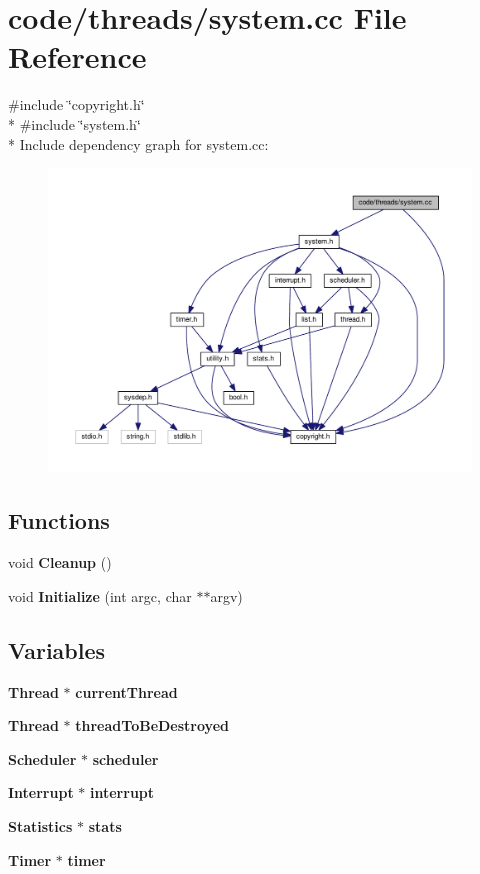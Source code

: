 \section{code/threads/system.cc File Reference}
\label{system_8cc}
{\ttfamily \#include \char`\"{}copyright.\+h\char`\"{}}\\*
{\ttfamily \#include \char`\"{}system.\+h\char`\"{}}\\*
Include dependency graph for system.\+cc\+:
\nopagebreak
\begin{figure}[H]
\begin{center}
\leavevmode
\includegraphics[width=350pt]{system_8cc__incl}
\end{center}
\end{figure}
\subsection*{Functions}
\begin{DoxyCompactItemize}
\item 
void {\bf Cleanup} ()
\item 
void {\bf Initialize} (int argc, char $\ast$$\ast$argv)
\end{DoxyCompactItemize}
\subsection*{Variables}
\begin{DoxyCompactItemize}
\item 
{\bf Thread} $\ast$ {\bf current\+Thread}
\item 
{\bf Thread} $\ast$ {\bf thread\+To\+Be\+Destroyed}
\item 
{\bf Scheduler} $\ast$ {\bf scheduler}
\item 
{\bf Interrupt} $\ast$ {\bf interrupt}
\item 
{\bf Statistics} $\ast$ {\bf stats}
\item 
{\bf Timer} $\ast$ {\bf timer}
\end{DoxyCompactItemize}


